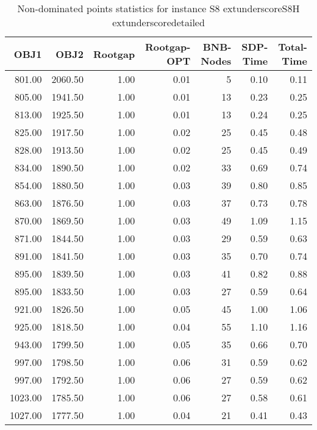 \begin{table}
\caption{Non-dominated points statistics for instance S8	extunderscoreS8H	extunderscoredetailed}
\label{tab:d}
\begin{tabular}{rrrrrrr}
\toprule
OBJ1 & OBJ2 & Rootgap & Rootgap-OPT & BNB-Nodes & SDP-Time & Total-Time \\
\midrule
801.00 & 2060.50 & 1.00 & 0.01 & 5 & 0.10 & 0.11 \\
805.00 & 1941.50 & 1.00 & 0.01 & 13 & 0.23 & 0.25 \\
813.00 & 1925.50 & 1.00 & 0.01 & 13 & 0.24 & 0.25 \\
825.00 & 1917.50 & 1.00 & 0.02 & 25 & 0.45 & 0.48 \\
828.00 & 1913.50 & 1.00 & 0.02 & 25 & 0.45 & 0.49 \\
834.00 & 1890.50 & 1.00 & 0.02 & 33 & 0.69 & 0.74 \\
854.00 & 1880.50 & 1.00 & 0.03 & 39 & 0.80 & 0.85 \\
863.00 & 1876.50 & 1.00 & 0.03 & 37 & 0.73 & 0.78 \\
870.00 & 1869.50 & 1.00 & 0.03 & 49 & 1.09 & 1.15 \\
871.00 & 1844.50 & 1.00 & 0.03 & 29 & 0.59 & 0.63 \\
891.00 & 1841.50 & 1.00 & 0.03 & 35 & 0.70 & 0.74 \\
895.00 & 1839.50 & 1.00 & 0.03 & 41 & 0.82 & 0.88 \\
895.00 & 1833.50 & 1.00 & 0.03 & 27 & 0.59 & 0.64 \\
921.00 & 1826.50 & 1.00 & 0.05 & 45 & 1.00 & 1.06 \\
925.00 & 1818.50 & 1.00 & 0.04 & 55 & 1.10 & 1.16 \\
943.00 & 1799.50 & 1.00 & 0.05 & 35 & 0.66 & 0.70 \\
997.00 & 1798.50 & 1.00 & 0.06 & 31 & 0.59 & 0.62 \\
997.00 & 1792.50 & 1.00 & 0.06 & 27 & 0.59 & 0.62 \\
1023.00 & 1785.50 & 1.00 & 0.06 & 27 & 0.58 & 0.61 \\
1027.00 & 1777.50 & 1.00 & 0.04 & 21 & 0.41 & 0.43 \\
\bottomrule
\end{tabular}
\end{table}
